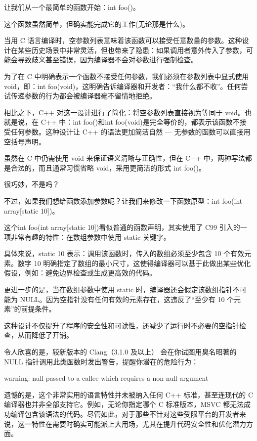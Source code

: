 让我们从一个最简单的函数开始：int foo()。

这个函数虽然简单，但确实能完成它的工作(无论那是什么)。

当用 C 语言编译时，空参数列表意味着该函数可以接受任意数量的参数。这种设计在某些历史场景中非常灵活，但也带来了隐患：如果调用者意外传入了参数，可能会导致歧义甚至错误，因为编译器不会对参数进行强制检查。

为了在 C 中明确表示一个函数不接受任何参数，我们必须在参数列表中显式使用 void，即：int foo(void)，这明确告诉编译器和开发者：“我什么都不收”。任何尝试传递参数的行为都会被编译器毫不留情地拒绝。

相比之下，C++ 对这一设计进行了简化：将空参数列表直接视为等同于 void。也就是说，在 C++ 中：int foo()和int foo(void)是完全等价的，都表示该函数不接受任何参数。这种设计让 C++ 的语法更加简洁自然 --- 无参数的函数可以直接用空括号声明。

虽然在 C 中仍需使用 void 来保证语义清晰与正确性，但在 C++ 中，两种写法都是合法的，而且通常习惯省略 void，采用更简洁的形式 int foo()。

很巧妙，不是吗？

不过，如果我们想给函数添加参数呢？让我们来修改一下函数原型：int foo(int array[static 10])。

这个int foo(int array[static 10])看似普通的函数声明，其实使用了 C99 引入的一项非常有趣的特性：在数组参数中使用 static 关键字。

具体来说，static 10 表示：调用该函数时，传入的数组必须至少包含 10 个有效元素。数字 10 明确指定了数组的最小尺寸，这使得编译器可以基于此做出某些优化假设，例如：避免边界检查或生成更高效的代码。

更进一步的是，当在数组参数中使用 static 时，编译器还会假定该数组指针不可能为 NULL。因为空指针没有任何有效的元素存在，这违反了“至少有 10 个元素”的前提条件。

这种设计不仅提升了程序的安全性和可读性，还减少了运行时不必要的空指针检查，从而降低了开销。

令人欣喜的是，较新版本的 Clang（3.1.0 及以上） 会在你试图用臭名昭著的 NULL 指针调用此类函数时发出警告，提醒你潜在的危险行为：

\begin{shell}
warning: null passed to a callee which requires a non-null argument
\end{shell}

遗憾的是，这个非常实用的语言特性并未被纳入任何 C++ 标准，甚至连现代的 C 编译器也并非全部支持它。例如，无论你指定哪个 C 标准版本，MSVC 都无法成功编译包含该语法的代码。尽管如此，对于那些不针对这些受限平台的开发者来说，这一特性在需要时确实可能派上大用场，尤其在提升代码安全性和优化潜力方面。

